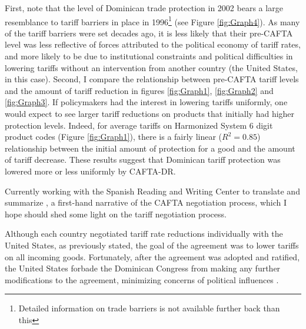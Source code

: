 \documentclass[12pt]{article}
\begin{document}
First, note that the level of Dominican trade protection in 2002 bears a large resemblance
to tariff barriers in place in 1996\footnote{Detailed
information on trade barriers is not available further back than this} (see Figure \ref{fig:Graph4}).
As many of the tariff barriers were set decades ago, it is less likely that their pre-CAFTA level 
was less reflective of forces attributed to the political economy of tariff rates, and 
more likely to be due to institutional constraints and
political difficulties in lowering tariffs without an intervention from another country (the
United States, in this case). 
Second, I compare the relationship between pre-CAFTA tariff
levels and the amount of tariff reduction in figures \ref{fig:Graph1}, \ref{fig:Graph2} and 
\ref{fig:Graph3}. If policymakers had the interest
in lowering tariffs uniformly, one would expect to see larger tariff reductions on products that
initially had higher protection levels. Indeed, for average tariffs on Harmonized System 
6 digit product codes (Figure \ref{fig:Graph1}), there is a fairly linear ($R^2=0.85$) relationship 
between the initial amount of protection for a good and
the amount of tariff decrease. These results suggest that Dominican tariff protection
was lowered more or less uniformly by CAFTA-DR.

Currently working with the Spanish Reading and Writing Center to translate and summarize 
\citep{guzman}, a first-hand narrative of the CAFTA negotiation process, which I hope
should shed some light on the tariff negotiation process.

Although each country negotiated tariff rate reductions individually with the
United States, as previously stated, the goal of the agreement was to lower tariffs on all
incoming goods. Fortunately, after the agreement was adopted and ratified, the United States
forbade the Dominican Congress from making any further modifications to the agreement, 
minimizing concerns of political influences \citep{usambassador}.

\vspace{-10pt}
\end{document}

